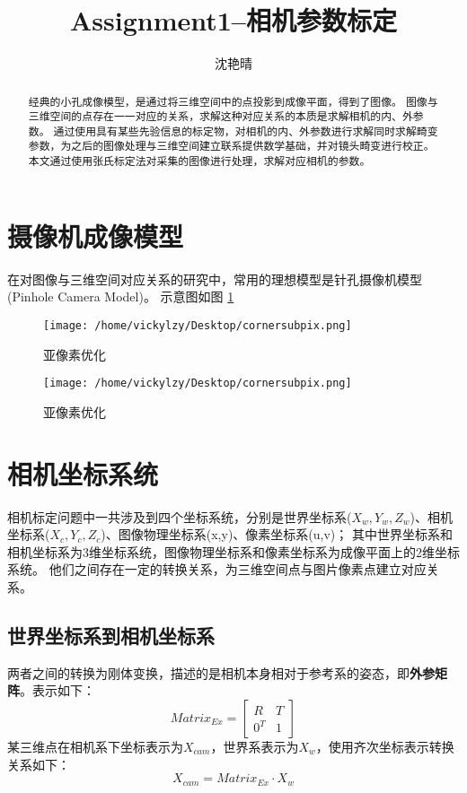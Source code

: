 \documentclass[10pt,a4paper]{article}
\author{沈艳晴}
\title{Assignment1--相机参数标定}
\begin{document}
\begin{CJK*}{UTF8}{gbsn}
\CJKindent%
\maketitle


\begin{abstract}
经典的小孔成像模型，是通过将三维空间中的点投影到成像平面，得到了图像。
图像与三维空间的点存在一一对应的关系，求解这种对应关系的本质是求解相机的内、外参数。
通过使用具有某些先验信息的标定物，对相机的内、外参数进行求解同时求解畸变参数，为之后的图像处理与三维空间建立联系提供数学基础，并对镜头畸变进行校正。
本文通过使用张氏标定法对采集的图像进行处理，求解对应相机的参数。
\end{abstract}

\section{摄像机成像模型}
在对图像与三维空间对应关系的研究中，常用的理想模型是针孔摄像机模型(Pinhole Camera Model)。
示意图如图 \ref{fig:camera1}

\begin{figure}[htbp]
    \centering
    \label{fig:camera1}
    \texttt{[image: /home/vickylzy/Desktop/cornersubpix.png]}
    \caption{亚像素优化}
\end{figure}

\begin{figure}[htbp]
    \centering
    \label{fig:camera2}
    \texttt{[image: /home/vickylzy/Desktop/cornersubpix.png]}
    \caption{亚像素优化}
\end{figure}
\section{相机坐标系统}
相机标定问题中一共涉及到四个坐标系统，分别是世界坐标系($X_w,Y_w,Z_w$)、相机坐标系($X_c,Y_c,Z_c$)、图像物理坐标系(x,y)、像素坐标系(u,v)；
其中世界坐标系和相机坐标系为3维坐标系统，图像物理坐标系和像素坐标系为成像平面上的2维坐标系统。
他们之间存在一定的转换关系，为三维空间点与图片像素点建立对应关系。
\subsection{世界坐标系到相机坐标系}
两者之间的转换为刚体变换，描述的是相机本身相对于参考系的姿态，即\textbf{外参矩阵}。表示如下：
\[Matrix_{Ex} = \begin{bmatrix}
R & T \\
0^{T} & 1
\end{bmatrix}\]
某三维点在相机系下坐标表示为$X_{cam}$，世界系表示为$X_{w}$，使用齐次坐标表示转换关系如下：
\begin{equation}
\label{ex}
X_{cam} = Matrix_{Ex} \cdot X_w
\end{equation}


\end{CJK*}
\end{document}
